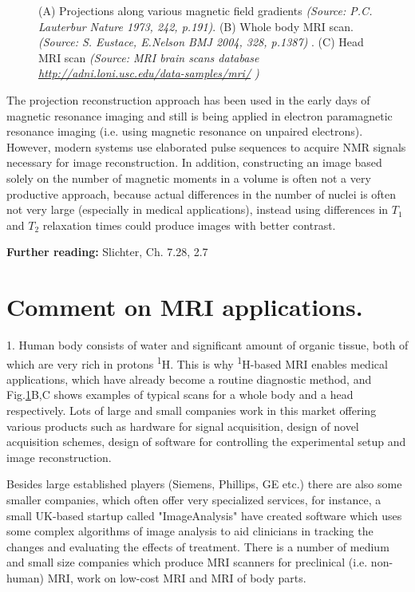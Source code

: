 \documentclass[a4paper, 12pt]{article}
\begin{document}
\begin{figure}[ht]
\caption{(A) Projections along various magnetic field gradients \textit{(Source: P.C. Lauterbur Nature 1973, 242, p.191)}. (B) Whole body MRI scan. \textit{(Source: S. Eustace, E.Nelson BMJ 2004, 328, p.1387) }. (C) Head MRI scan \textit{(Source: MRI brain scans database \url{http://adni.loni.usc.edu/data-samples/mri/} )} }
\label{fig:MRI}
\centering
\end{figure}

  The projection reconstruction approach has been used in the early days of magnetic resonance imaging and still is being applied in electron paramagnetic resonance imaging (i.e. using magnetic resonance on unpaired electrons). However, modern systems use elaborated pulse sequences to acquire NMR signals necessary for image reconstruction.
  In addition, constructing an image based solely on the number of magnetic moments in a volume is often not a very productive approach, because actual differences in the number of nuclei is often not very large (especially in medical applications), instead using differences in $T_1$ and $T_2$ relaxation times could produce images with better contrast.
  
\textbf{Further reading:} Slichter, Ch. 7.28, 2.7
  
  
\section{Comment on MRI applications.}
  1. Human body consists of water and significant amount of organic tissue, both of which are very rich in protons \textsuperscript{1}H. This is why \textsuperscript{1}H-based MRI enables medical applications, which have already become a routine diagnostic method, and Fig.\ref{fig:MRI}B,C shows examples of typical scans for a whole body and a head respectively. Lots of large and small companies work in this market offering various products such as hardware for signal acquisition, design of novel acquisition schemes, design of software for controlling the experimental setup and image reconstruction.
  
  Besides large established players (Siemens, Phillips, GE etc.) there are also some smaller companies, which often offer very specialized services, for instance, a small UK-based startup called "ImageAnalysis" have created software which uses some complex algorithms of image analysis to aid clinicians in tracking the changes and evaluating the effects of treatment.
  There is a number of medium and small size companies which produce MRI scanners for preclinical (i.e. non-human) MRI, work on low-cost MRI and MRI of body parts. 
\end{document}

